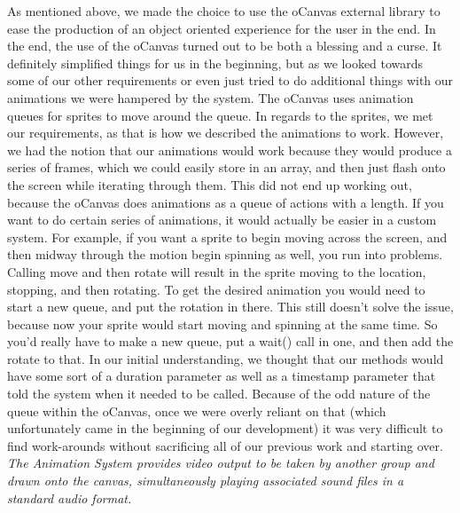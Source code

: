 \documentclass[12pt]{article}
\begin{document}
As mentioned above, we made the choice to use the oCanvas external library to ease the production of an object oriented experience for the user in the end. In the end, the use of the oCanvas turned out to be both a blessing and a curse. It definitely simplified things for us in the beginning, but as we looked towards some of our other requirements or even just tried to do additional things with our animations we were hampered by the system. The oCanvas uses animation queues for sprites to move around the queue. In regards to the sprites, we met our requirements, as that is how we described the animations to work. However, we had the notion that our animations would work because they would produce a series of frames, which we could easily store in an array, and then just flash onto the screen while iterating through them. This did not end up working out, because the oCanvas does animations as a queue of actions with a length. If you want to do certain series of animations, it would actually be easier in a custom system. For example, if you want a sprite to begin moving across the screen, and then midway through the motion begin spinning as well, you run into problems. Calling move and then rotate will result in the sprite moving to the location, stopping, and then rotating. To get the desired animation you would need to start a new queue, and put the rotation in there. This still doesn’t solve the issue, because now your sprite would start moving and spinning at the same time. So you’d really have to make a new queue, put a wait() call in one, and then add the rotate to that. In our initial understanding, we thought that our methods would have some sort of a duration parameter as well as a timestamp parameter that told the system when it needed to be called. Because of the odd nature of the queue within the oCanvas, once we were overly reliant on that (which unfortunately came in the beginning of our development) it was very difficult to find work-arounds without sacrificing all of our previous work and starting over.\\

\noindent\textit{The Animation System provides video output to be taken by another group and drawn onto the canvas, simultaneously playing associated sound files in a standard audio format.}\\
\end{document}

